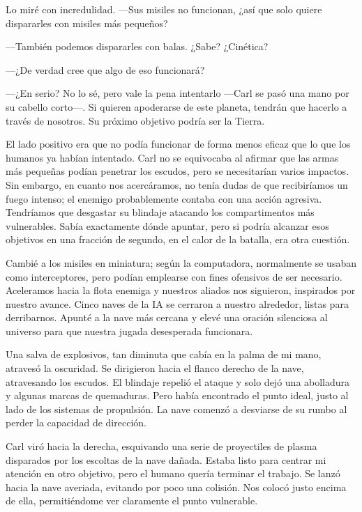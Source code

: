 Lo miré con incredulidad. —Sus misiles no funcionan, ¿así que solo quiere dispararles con misiles más pequeños?

—También podemos dispararles con balas. ¿Sabe? ¿Cinética?

 —¿De verdad cree que algo de eso funcionará?

 —¿En serio? No lo sé, pero vale la pena intentarlo —Carl se pasó una mano por su cabello corto—. Si quieren apoderarse de este planeta, tendrán que hacerlo a través de nosotros. Su próximo objetivo podría ser la Tierra.

El lado positivo era que no podía funcionar de forma menos eficaz que lo que los humanos ya habían intentado. Carl no se equivocaba al afirmar que las armas más pequeñas podían penetrar los escudos, pero se necesitarían varios impactos. Sin embargo, en cuanto nos acercáramos, no tenía dudas de que recibiríamos un fuego intenso; el enemigo probablemente contaba con una acción agresiva. Tendríamos que desgastar su blindaje atacando los compartimentos más vulnerables. Sabía exactamente dónde apuntar, pero si podría alcanzar esos objetivos en una fracción de segundo, en el calor de la batalla, era otra cuestión.

Cambié a los misiles en miniatura; según la computadora, normalmente se usaban como interceptores, pero podían emplearse con fines ofensivos de ser necesario. Aceleramos hacia la flota enemiga y nuestros aliados nos siguieron, inspirados por nuestro avance. Cinco naves de la IA se cerraron a nuestro alrededor, listas para derribarnos. Apunté a la nave más cercana y elevé una oración silenciosa al universo para que nuestra jugada desesperada funcionara.

Una salva de explosivos, tan diminuta que cabía en la palma de mi mano, atravesó la oscuridad. Se dirigieron hacia el flanco derecho de la nave, atravesando los escudos. El blindaje repelió el ataque y solo dejó una abolladura y algunas marcas de quemaduras. Pero había encontrado el punto ideal, justo al lado de los sistemas de propulsión. La nave comenzó a desviarse de su rumbo al perder la capacidad de dirección.

Carl viró hacia la derecha, esquivando una serie de proyectiles de plasma disparados por los escoltas de la nave dañada. Estaba listo para centrar mi atención en otro objetivo, pero el humano quería terminar el trabajo. Se lanzó hacia la nave averiada, evitando por poco una colisión. Nos colocó justo encima de ella, permitiéndome ver claramente el punto vulnerable.

